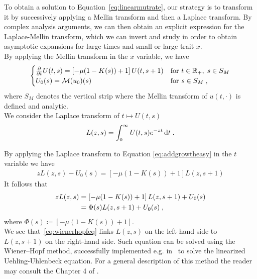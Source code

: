 To obtain a solution to Equation~\eqref{eq:linearmutrate}, our strategy is to transform it by successively applying a Mellin transform and then a Laplace transform. By complex analysis arguments, we can then obtain an explicit expression for the Laplace-Mellin transform, which we can invert and study in order to obtain asymptotic expansions for large times and small or large trait $x$. \\

By applying the Mellin transform in the $x$ variable, we have
    \begin{equation}
    \label{eq:addgrowtheasy}
	\begin{cases}
		\frac{\partial}{\partial t} U(t,s)
        = \left[- \mu (1-K(s)) + 1\right] U(t,s+1)
        & \text{for } t \in \mathbb{R}_+, \; s \in S_M 
        \\
        U_0(s) 
        = \mathcal{M}(u_0)(s) 
        & \text{for } s \in S_M 
		\; ,
	\end{cases}
    \end{equation}
where $S_M$ denotes the vertical strip where the Mellin transform of $u(t,\cdot)$ is defined and analytic. \\

We consider the Laplace transform of $t \mapsto U(t,s)$
\begin{align}
    L(z,s) = \int_0^\infty U(t,s)e^{-zt}\,\mathrm{d} t
    \; .
\end{align}

By applying the Laplace transform to Equation \eqref{eq:addgrowtheasy} in the $t$ variable we have 
\begin{align*}
    zL(z,s) - U_0(s) = \left[- \mu (1-K(s)) + 1\right] L(z,s+1)
\end{align*}
It follows that 
\begin{equation}
\begin{aligned}
    \label{eq:wienerhopfeq}
    zL(z,s) 
    &= \left[- \mu (1-K(s)) + 1\right] L(z, s+1) + U_0(s) \\
    &= \Phi(s) L(z, s+1) + U_0(s)
    \; ,
\end{aligned} 
\end{equation}
where $\Phi(s) \coloneqq \left[- \mu (1-K(s)) + 1\right]$. \\

{\MD We see that~\eqref{eq:wienerhopfeq} links $L(z,s)$ on the left-hand side to $L(z,s+1)$ on the right-hand side.  Such equation can be solved using} the Wiener--Hopf method,  successfully implemented e.g. in~\cite{escobedo2007fundamental} to solve the linearized Uehling-Uhlenbeck equation. For a general description of this method the reader may consult the Chapter 4 of \cite{zakharov2012kolmogorov}. 
\medskip

